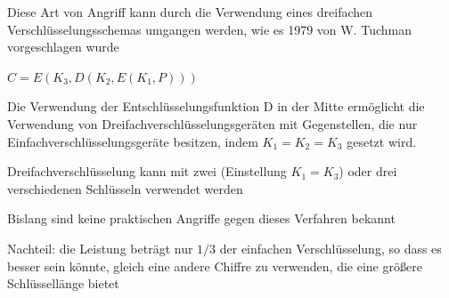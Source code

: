 \documentclass[a4paper]{article}
\begin{document}
\begin{multicols}{3}
\begin{itemize*}
            \item Diese Art von Angriff kann durch die Verwendung eines dreifachen Verschlüsselungsschemas umgangen werden, wie es 1979 von W. Tuchman vorgeschlagen wurde
            \item $C=E(K_3,D(K_2,E(K_1,P)))$
            \item Die Verwendung der Entschlüsselungsfunktion D in der Mitte ermöglicht die Verwendung von Dreifachverschlüsselungsgeräten mit Gegenstellen, die nur Einfachverschlüsselungsgeräte besitzen, indem $K_1=K_2=K_3$ gesetzt wird.
            \item Dreifachverschlüsselung kann mit zwei (Einstellung $K_1=K_3$) oder drei verschiedenen Schlüsseln verwendet werden
            \item Bislang sind keine praktischen Angriffe gegen dieses Verfahren bekannt
            \item Nachteil: die Leistung beträgt nur $1/3$ der einfachen Verschlüsselung, so dass es besser sein könnte, gleich eine andere Chiffre zu verwenden, die eine größere Schlüssellänge bietet
      \end{itemize*}


\end{multicols}
\end{document}
